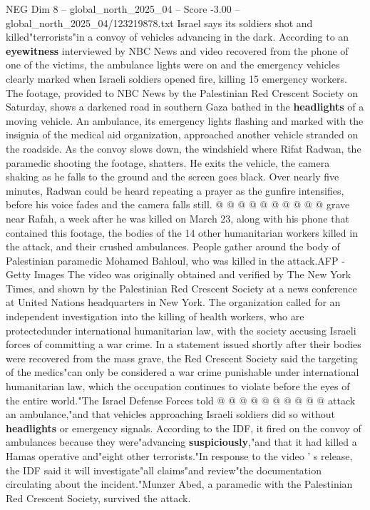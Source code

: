 \begin{textsample}{NEG Dim 8 – global\_north\_2025\_04 – Score -3.00 – global\_north\_2025\_04/123219878.txt}  \label{ex:f8_neg_081}
Israel says its soldiers shot and killed"terrorists"in a convoy of vehicles advancing in the dark.
According to an \textbf{eyewitness} interviewed by NBC News and video recovered from the phone of one of the victims, the ambulance lights were on and the emergency vehicles clearly marked when Israeli soldiers opened fire, killing 15 emergency workers.
The footage, provided to NBC News by the Palestinian Red Crescent Society on Saturday, shows a darkened road in southern Gaza bathed in the \textbf{headlights} of a moving vehicle.
An ambulance, its emergency lights flashing and marked with the insignia of the medical aid organization, approached another vehicle stranded on the roadside.
As the convoy slows down, the windshield where Rifat Radwan, the paramedic shooting the footage, shatters.
He exits the vehicle, the camera shaking as he falls to the ground and the screen goes black.
Over nearly five minutes, Radwan could be heard repeating a prayer as the gunfire intensifies, before his voice fades and the camera falls still. @ @ @ @ @ @ @ @ @ @ grave near Rafah, a week after he was killed on March 23, along with his phone that contained this footage, the bodies of the 14 other humanitarian workers killed in the attack, and their crushed ambulances.
People gather around the body of Palestinian paramedic Mohamed Bahloul, who was killed in the attack.AFP - Getty Images The video was originally obtained and verified by The New York Times, and shown by the Palestinian Red Crescent Society at a news conference at United Nations headquarters in New York.
The organization called for an independent investigation into the killing of health workers, who are protectedunder international humanitarian law, with the society accusing Israeli forces of committing a war crime.
In a statement issued shortly after their bodies were recovered from the mass grave, the Red Crescent Society said the targeting of the medics"can only be considered a war crime punishable under international humanitarian law, which the occupation continues to violate before the eyes of the entire world."The Israel Defense Forces told @ @ @ @ @ @ @ @ @ @ attack an ambulance,"and that vehicles approaching Israeli soldiers did so without \textbf{headlights} or emergency signals.
According to the IDF, it fired on the convoy of ambulances because they were"advancing \textbf{suspiciously},"and that it had killed a Hamas operative and"eight other terrorists."In response to the video ' s release, the IDF said it will investigate"all claims"and review"the documentation circulating about the incident."Munzer Abed, a paramedic with the Palestinian Red Crescent Society, survived the attack.

\end{textsample}
